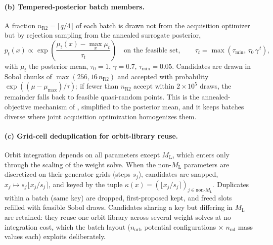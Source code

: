 \paragraph{(b) Tempered-posterior batch members.} A fraction
$n_\mathrm{R2} = \lceil q/4 \rceil$ of each batch is drawn not from the
acquisition optimizer but by rejection sampling from the annealed
surrogate posterior,
\begin{equation}
  p_t(x) \propto \exp\!\left(\frac{\mu_t(x) - \max_x \mu_t}{\tau_t}\right)
  \quad \text{on the feasible set},
  \qquad \tau_t = \max(\tau_\mathrm{min},\, \tau_0\,\gamma^{\,t}),
\end{equation}
with $\mu_t$ the posterior mean, $\tau_0 = 1$, $\gamma = 0.7$,
$\tau_\mathrm{min} = 0.05$. Candidates are drawn in Sobol chunks of
$\max(256, 16\,n_\mathrm{R2})$ and accepted with probability
$\exp((\mu - \mu_\mathrm{max})/\tau)$; if fewer than $n_\mathrm{R2}$
accept within $2\times10^5$ draws, the remainder falls back to feasible
quasi-random points. This is the annealed-objective mechanism of
\citet{li2026sale}, simplified to the posterior mean, and it keeps
batches diverse where joint acquisition optimization homogenizes them.

\paragraph{(c) Grid-cell deduplication for orbit-library reuse.}
Orbit integration depends on all parameters except $M_\mathrm{L}$, which
enters only through the scaling of the weight solve. When the
non-$M_\mathrm{L}$ parameters are discretized on their generator grids
(steps $s_j$), candidates are snapped, $x_j \mapsto s_j
\lfloor x_j / s_j \rceil$, and keyed by the tuple
$\kappa(x) = (\lfloor x_j / s_j \rceil)_{j \in \text{non-}M_\mathrm{L}}$.
Duplicates within a batch (same key) are dropped, first-proposed kept,
and freed slots refilled with feasible Sobol draws. Candidates sharing a
key but differing in $M_\mathrm{L}$ are retained: they reuse one orbit
library across several weight solves at no integration cost, which the
batch layout ($n_\mathrm{orb}$ potential configurations $\times$
$n_\mathrm{ml}$ mass values each) exploits deliberately.


